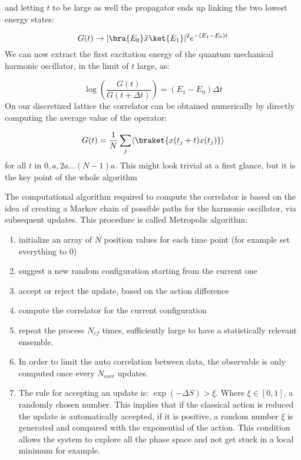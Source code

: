 \documentclass[%
oneside,                 %
final,                   %
10pt]{article}
\begin{document}
and letting $t$ to be large as well the propagator ends up linking the two lowest energy states:

\[
	G(t) \rightarrow  |\bra{E_0} \tilde{x} \ket{E_1}|^2e^{-(E_1-E_0)t}
\]
We can now extract the first excitation energy of the quantum mechanical harmonic oscillator, in the limit of $t$ large, as:

\[
	\log\left( \frac{G(t)}{G(t+\Delta t)}\right) = (E_1 - E_0)\Delta t
\]
On our discretized lattice the correlator can be obtained numerically by directly computing the average value of the operator:

\[
	G(t) = \frac{1}{N}\sum_j\langle\braket{x(t_j+t)x(t_j)}\rangle
\]
for all $t$ in $0, a, 2a\dots (N-1)a$. This might look trivial at a first glance, but it is the key point of the whole algorithm

The computational algorithm required to compute the correlator is based on the idea of creating a Markov chain of possible paths for the harmonic oscillator, via subsequent updates. This procedure is called Metropolis algorithm:
\begin{enumerate}
\item initialize an array of $N$ position values for each time point (for example set everything to 0)

\item suggest a new random configuration starting from the current one

\item accept or reject the update, based on the action difference

\item compute the correlator for the current configuration

\item repeat the process $N_{cf}$ times, sufficiently large to have a statistically relevant ensemble.

\item In order to limit the auto correlation between data, the observable is only computed once every $N_{corr}$ updates. 

\item The rule for accepting an update is: $\exp(-\Delta S) > \xi$. Where $\xi \in [0,1]$, a randomly chosen number. This implies that if the classical action is reduced the update is automatically accepted, if it is positive, a random number $\xi$ is generated and compared with the exponential of the action. This condition allows the system to explore all the phase space and not get stuck in a local minimum for example.
\end{enumerate}
\end{document}
